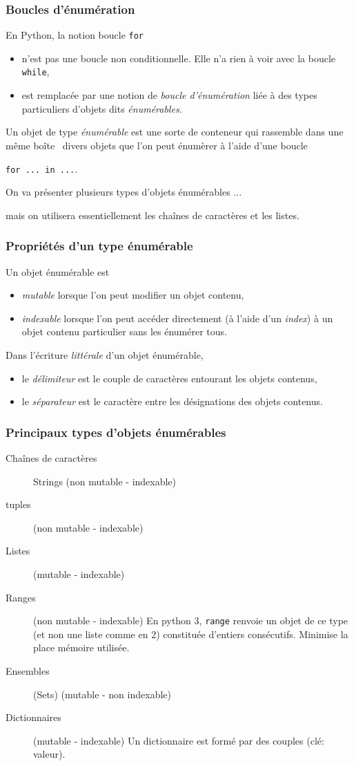 



\begin{frame}
  \frametitle{Boucles d'énumération}
En Python, la notion boucle \texttt{for}
\begin{itemize}
  \item  n'est pas une boucle non conditionnelle. Elle n'a rien à voir avec la boucle \texttt{while},
  \item  est remplacée par une notion de \emph{boucle d'énumération} liée à des types particuliers d'objets dits \emph{énumérables}.
\end{itemize}
Un objet de type \emph{énumérable} est une sorte de conteneur qui rassemble \og dans une même boîte\fg~ divers objets que l'on peut énumèrer  à l'aide d'une boucle
\begin{center}
\texttt{for ... in ...}.  
\end{center}
On va présenter plusieurs types d'objets énumérables ...

mais on utilisera essentiellement les chaînes de caractères et les listes.
\end{frame}

\begin{frame}
  \frametitle{Propriétés d'un type énumérable}
Un objet énumérable est
\begin{itemize}
  \item \emph{mutable} lorsque l'on peut modifier un objet contenu,
  \item \emph{indexable} lorsque l'on peut accéder directement (à l'aide d'un \emph{index}) à un objet contenu particulier sans les énumérer tous.
\end{itemize}

Dans l'écriture \emph{littérale} d'un objet énumérable,
\begin{itemize}
  \item le \emph{délimiteur} est le couple de caractères entourant les objets contenus,
  \item le \emph{séparateur} est le caractère entre les désignations des objets contenus.
\end{itemize}
\end{frame}

\begin{frame}
  \frametitle{Principaux types d'objets énumérables}
\begin{description}
 \item [Chaînes de caractères] Strings (non mutable - indexable) 
 \item [tuples] (non mutable - indexable) 
 \item [Listes] (mutable - indexable)
 \item [Ranges] (non mutable - indexable) En python 3, \texttt{range} renvoie un objet de ce type (et non une liste comme en 2) constituée d'entiers consécutifs. Minimise la place mémoire utilisée.
 \item [Ensembles] (Sets) (mutable - non indexable) 
 \item [Dictionnaires] (mutable - indexable) Un dictionnaire est formé par des couples (clé: valeur). 
\end{description}
\end{frame}

